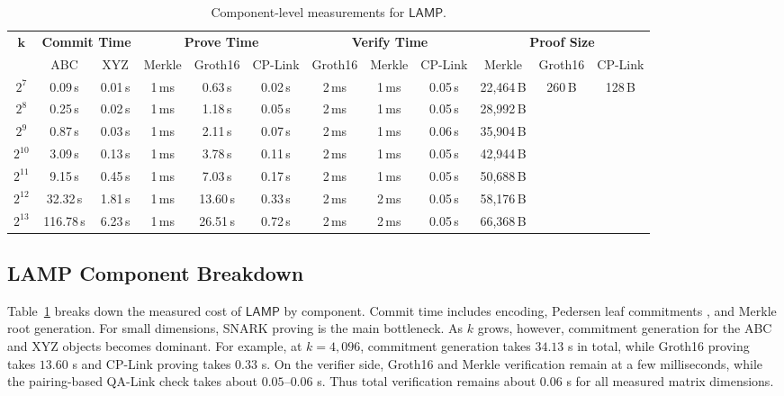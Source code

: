 \documentclass[conference,compsoc]{IEEEtran}
\newcommand{\protocol}{\textsf{LAMP}}   %
\theoremstyle{plain}
\theoremstyle{definition}
\theoremstyle{remark}
\providecommand{\DIFaddtex}[1]{{\protect\color{DIFADD} \sf #1}} %
\providecommand{\DIFaddbegin}{} %
\providecommand{\DIFaddend}{} %
\providecommand{\DIFadd}[1]{\texorpdfstring{\DIFaddtex{#1}}{#1}} %
\providecommand{\DIFaddincludegraphics}[2][]{{\color{blue}\fbox{\DIFOincludegraphics[#1]{#2}}}} %
\DeclareRobustCommand{\DIFaddbegin}{\DIFOaddbegin \let\includegraphics\DIFaddincludegraphics} %
\DeclareRobustCommand{\DIFaddend}{\DIFOaddend \let\includegraphics\DIFOincludegraphics} %
\begin{document}
\begin{table}[!t]
\centering
\setlength{\tabcolsep}{3.5pt}
\begin{adjustbox}{max width=\textwidth}
\begin{tabular}{c cc ccc ccc ccc}
\toprule
\multirow{2}{*}{\(\boldsymbol{k}\)}
& \multicolumn{2}{c}{\textbf{Commit Time}}
& \multicolumn{3}{c}{\textbf{Prove Time}}
& \multicolumn{3}{c}{\textbf{Verify Time}}
& \multicolumn{3}{c}{\textbf{Proof Size}} \\
\cmidrule(lr){2-3}\cmidrule(lr){4-6}\cmidrule(lr){7-9}\cmidrule(lr){10-12}
& ABC & XYZ
& Merkle & Groth16 & CP-Link
& Groth16 & Merkle & CP-Link
& Merkle & Groth16 & CP-Link \\
\midrule
$2^7$    & 0.09\,s    & 0.01\,s & 1\,ms & 0.63\,s  & 0.02\,s & 2\,ms & 1\,ms & 0.05\,s & 22{,}464\,B & \multirow{7}{*}{260\,B} & \multirow{7}{*}{128\,B} \\
$2^8$    & 0.25\,s    & 0.02\,s & 1\,ms & 1.18\,s  & 0.05\,s & 2\,ms & 1\,ms & 0.05\,s & 28{,}992\,B & & \\
$2^9$    & 0.87\,s    & 0.03\,s & 1\,ms & 2.11\,s  & 0.07\,s & 2\,ms & 1\,ms & 0.06\,s & 35{,}904\,B & & \\
$2^{10}$ & 3.09\,s    & 0.13\,s & 1\,ms & 3.78\,s  & 0.11\,s & 2\,ms & 1\,ms & 0.05\,s & 42{,}944\,B & & \\
$2^{11}$ & 9.15\,s    & 0.45\,s & 1\,ms & 7.03\,s  & 0.17\,s & 2\,ms & 1\,ms & 0.05\,s & 50{,}688\,B & & \\
$2^{12}$ & 32.32\,s   & 1.81\,s & 1\,ms & 13.60\,s & 0.33\,s & 2\,ms & 2\,ms & 0.05\,s & 58{,}176\,B & & \\
$2^{13}$ & 116.78\,s  & 6.23\,s & 1\,ms & 26.51\,s & 0.72\,s & 2\,ms & 2\,ms & 0.05\,s & 66{,}368\,B & & \\
\bottomrule
\end{tabular}
\end{adjustbox}
\vspace{6pt}
\caption{Component-level measurements for \(\protocol\).}
\label{tab:lamp-breakdown}
\end{table}

\subsection{LAMP Component Breakdown}
\label{sec:eval-lamp-breakdown}

Table~\ref{tab:lamp-breakdown} breaks down the measured cost of \(\protocol\)
by component.  Commit time includes  \DIFaddbegin \DIFadd{encoding, }\DIFaddend Pedersen leaf commitments\DIFaddbegin \DIFadd{, }\DIFaddend and
Merkle root generation.  For small dimensions, SNARK proving is the main bottleneck.
As \(k\) grows, however, commitment generation for the ABC and XYZ objects
becomes dominant.  For example, at \(k=4{,}096\), commitment generation takes
\(34.13\) s in total, while Groth16 proving takes \(13.60\) s and CP-Link
proving takes \(0.33\) s.  On the verifier side, Groth16 and Merkle
verification remain at a few milliseconds, while the pairing-based QA-Link
check takes about \(0.05\)--\(0.06\) s.  Thus total verification remains about \(0.06\) s for all measured matrix dimensions.
\end{document}

